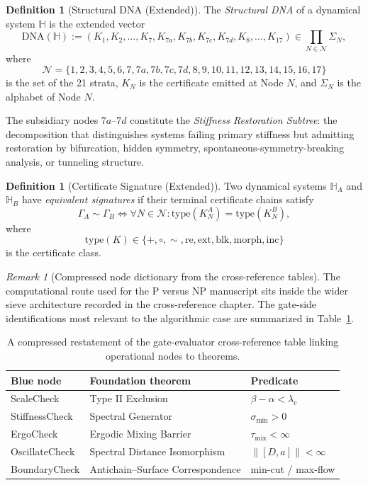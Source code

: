 \documentclass[11pt]{article}
\theoremstyle{definition}
\newtheorem{definition}[theorem]{Definition}
\theoremstyle{remark}
\newtheorem{remark}[theorem]{Remark}
\begin{document}
\begin{definition}[Structural DNA (Extended)]\label{def-structural-dna}
The \emph{Structural DNA} of a dynamical system $\mathbb{H}$ is the extended vector
\[
\mathrm{DNA}(\mathbb{H}) := (K_1, K_2, \ldots, K_7, K_{7a}, K_{7b}, K_{7c}, K_{7d}, K_8, \ldots, K_{17}) \in \prod_{N \in \mathcal{N}} \Sigma_N,
\]
where
\[
\mathcal{N} = \{1, 2, 3, 4, 5, 6, 7, 7a, 7b, 7c, 7d, 8, 9, 10, 11, 12, 13, 14, 15, 16, 17\}
\]
is the set of the 21 strata, $K_N$ is the certificate emitted at Node $N$, and $\Sigma_N$ is the alphabet of Node $N$.

The subsidiary nodes $7a$--$7d$ constitute the \emph{Stiffness Restoration Subtree}: the decomposition that distinguishes systems failing primary stiffness but admitting restoration by bifurcation, hidden symmetry, spontaneous-symmetry-breaking analysis, or tunneling structure.
\end{definition}

\begin{definition}[Certificate Signature (Extended)]\label{def-certificate-signature}
Two dynamical systems $\mathbb{H}_A$ and $\mathbb{H}_B$ have \emph{equivalent signatures} if their terminal certificate chains satisfy
\[
\Gamma_A \sim \Gamma_B
\iff
\forall N \in \mathcal{N}: \mathrm{type}(K_N^A) = \mathrm{type}(K_N^B),
\]
where
\[
\mathrm{type}(K) \in \{+, \circ, \sim, \mathrm{re}, \mathrm{ext}, \mathrm{blk}, \mathrm{morph}, \mathrm{inc}\}
\]
is the certificate class.
\end{definition}

\begin{remark}[Compressed node dictionary from the cross-reference tables]\label{rem-cross-reference-summary}
The computational route used for the P versus NP manuscript sits inside the wider sieve architecture recorded in the cross-reference chapter. The gate-side identifications most relevant to the algorithmic case are summarized in Table~\ref{tab:gate-cross-reference}.
\end{remark}

\begin{table}[h]
\centering
\small
\begin{tabular}{@{}lll@{}}
\toprule
Blue node & Foundation theorem & Predicate \\
\midrule
ScaleCheck & Type II Exclusion & $\beta - \alpha < \lambda_c$ \\
StiffnessCheck & Spectral Generator & $\sigma_{\min} > 0$ \\
ErgoCheck & Ergodic Mixing Barrier & $\tau_{\mathrm{mix}} < \infty$ \\
OscillateCheck & Spectral Distance Isomorphism & $\|[D,a]\| < \infty$ \\
BoundaryCheck & Antichain--Surface Correspondence & min-cut / max-flow \\
\bottomrule
\end{tabular}
\caption{A compressed restatement of the gate-evaluator cross-reference table linking operational nodes to theorems.}
\label{tab:gate-cross-reference}
\end{table}
\end{document}
